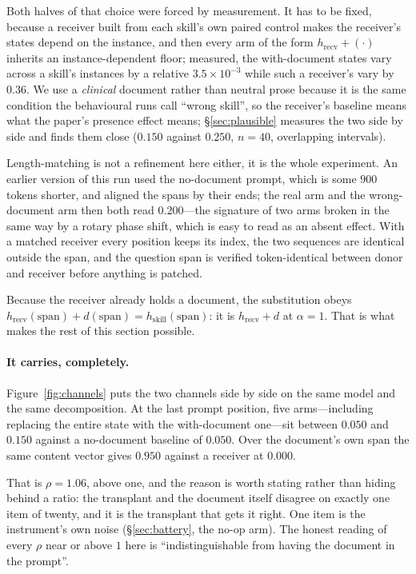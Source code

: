 \documentclass{article}
\newcommand{\dvec}{\ensuremath{d}}
\begin{document}
Both halves of that choice were forced by measurement. It has to be fixed,
because a receiver built from each skill's own paired control makes the
receiver's states depend on the instance, and then every arm of the form
$h_{\text{recv}} + (\cdot)$ inherits an instance-dependent floor; measured, the
with-document states vary across a skill's instances by a relative
$3.5\times10^{-3}$ while such a receiver's vary by $0.36$. We use a
\emph{clinical} document rather than neutral prose because it is the same
condition the behavioural runs call
``wrong skill'', so the receiver's baseline means what the paper's presence
effect means; \S\ref{sec:plausible} measures the two side by side and finds them
close ($0.150$ against $0.250$, $n=40$, overlapping intervals).

Length-matching is not a refinement here either, it is the whole experiment. An
earlier version of this run used the no-document
prompt, which is some $900$ tokens shorter, and aligned the spans by their ends;
the real arm and the wrong-document arm then both read $0.200$---the signature
of two arms broken in the same way by a rotary phase shift, which is easy to
read as an absent effect. With a matched receiver every position keeps its
index, the two sequences are identical outside the span, and the question span
is verified token-identical between donor and receiver before anything is
patched.

Because the receiver already holds a document, the substitution obeys
$h_{\text{recv}}(\text{span}) + \dvec(\text{span}) = h_{\text{skill}}(\text{span})$: it is $h_{\text{recv}} + \dvec$ at $\alpha=1$. That is
what makes the rest of this section possible.

\paragraph{It carries, completely.} Figure~\ref{fig:channels} puts the two
channels side by side on the same model and the same decomposition. At the last
prompt position, five arms---including replacing the entire state with the
with-document one---sit between $0.050$ and $0.150$ against a no-document
baseline of $0.050$. Over the document's own span the same content vector gives
$0.950$ against a receiver at $0.000$.

That is $\rho = 1.06$, above one, and the reason is worth stating rather than
hiding behind a ratio: the transplant and the document itself disagree on
exactly one item of twenty, and it is the transplant that gets it right. One
item is the instrument's own noise (\S\ref{sec:battery}, the no-op arm). The
honest reading of every $\rho$ near or above $1$ here is ``indistinguishable
from having the document in the prompt''.
\end{document}
